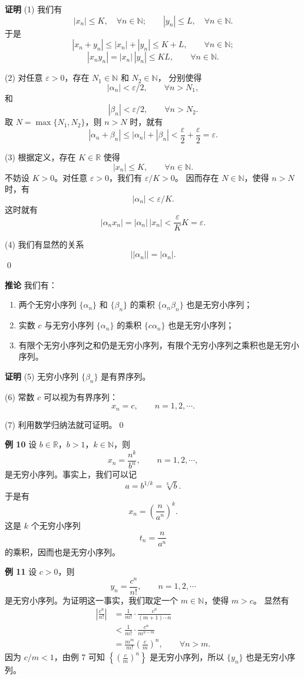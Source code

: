 \documentclass[12pt,a4paper,oneside]{ctexbook}
\begin{document}
\textbf{证明}\quad
(1) 我们有
\[
    |x_n|\le K,\quad \forall n\in\mathbb{N};
    \qquad
    |y_n|\le L,\quad \forall n\in\mathbb{N}.
\]
于是
\[
    |x_n+y_n|\le |x_n|+|y_n|\le K+L,\qquad \forall n\in\mathbb{N};
\]
\[
    |x_ny_n|=|x_n|\,|y_n|\le KL,\qquad \forall n\in\mathbb{N}.
\]

(2) 对任意 $\varepsilon>0$，存在 $N_1\in\mathbb{N}$ 和 $N_2\in\mathbb{N}$，
分别使得
\[
    |\alpha_n|<\varepsilon/2,\qquad \forall n>N_1,
\]
和
\[
    |\beta_n|<\varepsilon/2,\qquad \forall n>N_2.
\]
取 $N=\max\{N_1,N_2\}$，则 $n>N$ 时，就有
\[
    |\alpha_n+\beta_n|
    \le |\alpha_n|+|\beta_n|
    <\frac{\varepsilon}{2}+\frac{\varepsilon}{2}
    =\varepsilon.
\]

(3) 根据定义，存在 $K\in\mathbb{R}$ 使得
\[
    |x_n|\le K,\qquad \forall n\in\mathbb{N}.
\]
不妨设 $K>0$。对任意 $\varepsilon>0$，我们有 $\varepsilon/K>0$。
因而存在 $N\in\mathbb{N}$，使得 $n>N$ 时，有
\[
    |\alpha_n|<\varepsilon/K.
\]
这时就有
\[
    |\alpha_nx_n|=|\alpha_n|\,|x_n|<\frac{\varepsilon}{K}K=\varepsilon.
\]

(4) 我们有显然的关系
\[
    \bigl||\alpha_n|\bigr|=|\alpha_n|.
\]
\qed

\medskip
\textbf{推论}\quad
我们有：
\begin{enumerate}[label=(\arabic*), start=5]
  \item 两个无穷小序列 $\{\alpha_n\}$ 和 $\{\beta_n\}$ 的乘积
  $\{\alpha_n\beta_n\}$ 也是无穷小序列；

  \item 实数 $c$ 与无穷小序列 $\{\alpha_n\}$ 的乘积
  $\{c\alpha_n\}$ 也是无穷小序列；

  \item 有限个无穷小序列之和仍是无穷小序列，有限个无穷小序列之乘积也是无穷小序列。
\end{enumerate}

\textbf{证明}\quad
(5) 无穷小序列 $\{\beta_n\}$ 是有界序列。

(6) 常数 $c$ 可以视为有界序列：
\[
    x_n=c,\qquad n=1,2,\cdots.
\]

(7) 利用数学归纳法就可证明。\qed

\medskip
\textbf{例 10}\quad
设 $b\in\mathbb{R}$，$b>1$，$k\in\mathbb{N}$，则
\[
    x_n=\frac{n^k}{b^n},\qquad n=1,2,\cdots,
\]
是无穷小序列。事实上，我们可以记
\[
    a=b^{1/k}=\sqrt[k]{b}.
\]
于是有
\[
    x_n=\left(\frac{n}{a^n}\right)^k.
\]
这是 $k$ 个无穷小序列
\[
    t_n=\frac{n}{a^n}
\]
的乘积，因而也是无穷小序列。

\medskip
\textbf{例 11}\quad
设 $c>0$，则
\[
    y_n=\frac{c^n}{n!},\qquad n=1,2,\cdots
\]
是无穷小序列。为证明这一事实，我们取定一个 $m\in\mathbb{N}$，使得 $m>c$。
显然有
\begin{align*}
\left|\frac{c^n}{n!}\right|
&=\frac1{m!}\cdot \frac{c^n}{(m+1)\cdots n}\\
&<\frac1{m!}\cdot \frac{c^n}{m^{n-m}}\\
&=\frac{m^m}{m!}\left(\frac{c}{m}\right)^n,\qquad \forall n>m.
\end{align*}
因为 $c/m<1$，由例 7 可知 $\left\{\left(\frac{c}{m}\right)^n\right\}$
是无穷小序列，所以 $\{y_n\}$ 也是无穷小序列。
\end{document}
